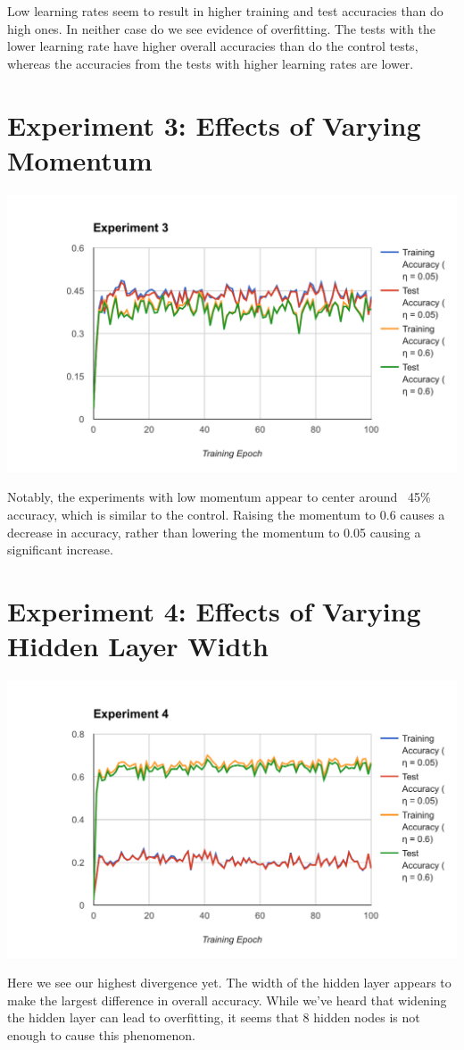 \documentclass[11pt, oneside]{article}    %
\begin{document}
Low learning rates seem to result in higher training and test accuracies than do high ones. In neither case do we see evidence of overfitting. The tests with the lower learning rate have higher overall accuracies than do the control tests, whereas the accuracies from the tests with higher learning rates are lower.

\section*{Experiment 3: Effects of Varying Momentum}

\begin{center}
	\includegraphics[width=6in]{Exp3}
\end{center}

Notably, the experiments with low momentum appear to center around ~45\% accuracy, which is similar to the control. Raising the momentum to 0.6 causes a decrease in accuracy, rather than lowering the momentum to 0.05 causing a significant increase.

\section*{Experiment 4: Effects of Varying Hidden Layer Width}

\begin{center}
	\includegraphics[width=6in]{Exp4}
\end{center}

Here we see our highest divergence yet. The width of the hidden layer appears to make the largest difference in overall accuracy. While we've heard that widening the hidden layer can lead to overfitting, it seems that 8 hidden nodes is not enough to cause this phenomenon.
\end{document}
